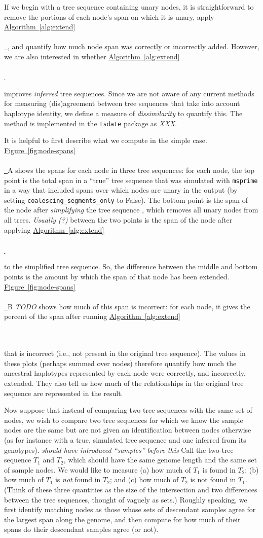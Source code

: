 \documentclass[10pt,twoside,lineno]{gsajnl}
\newcommand{\msprime}{\texttt{msprime}}
\newcommand{\comment}[1]{{\color{violet} \it #1}}
\newcommand{\algorithmref}[2][]{%
	\hyperref[{#2}]{%
		Algorithm~\ref*{#2}%
		\ifx\\#1\\%
		\else
		\,#1%
		\fi
	}%
}
\newcommand*{\figref}[2][]{%
	\hyperref[{#2}]{%
		Figure~\ref*{#2}%
		\ifx\\#1\\%
		\else
		\,#1%
		\fi
	}%
}
\begin{document}
If we begin with a tree sequence containing unary nodes,
it is straightforward to remove the portions of each node's span on which it is unary,
apply \algorithmref{alg:extend},
and quantify how much node span was correctly or incorrectly added.
However, we are also interested in whether \algorithmref{alg:extend}
improves \emph{inferred} tree sequences.
Since we are not aware of any current methods for measuring (dis)agreement between tree sequences
that take into account haplotype identity,
we define a measure of \emph{dissimilarity} to quantify this.
The method is implemented in the \texttt{tsdate} package \citep{wohns2022unified}
as \comment{XXX}.

It is helpful to first describe what we compute in the simple case.
\figref{fig:node-spans}A shows the spans for each node in three tree sequences:
for each node, the top point is the total span in a ``true'' tree sequence
that was simulated with \msprime \citep{kelleher2016efficient,baumdicker2021efficient}
in a way that included spans over which nodes are unary in the output
(by setting \texttt{coalescing\_segments\_only} to False).
The bottom point is the span of the node after \emph{simplifying} the tree sequence
\citep{kelleher2018efficient},
which removes all unary nodes from all trees.
\comment{Usually (?)} between the two points
is the span of the node after applying \algorithmref{alg:extend}
to the simplified tree sequence.
So, the difference between the middle and bottom points is the amount by which
the span of that node has been extended.
\figref{fig:node-spans}B \comment{TODO} shows how much of this span is incorrect:
for each node, it gives the percent of the span after running \algorithmref{alg:extend}
that is incorrect (i.e., not present in the original tree sequence).
The values in these plots (perhaps summed over nodes)
therefore quantify how much the ancestral haplotypes represented by each node
were correctly, and incorrectly, extended.
They also tell us how much of the relationships in the original tree sequence
are represented in the result.

Now suppose that instead of comparing two tree sequences with the same set of nodes,
we wish to compare two tree sequences for which we know the sample nodes are the same
but are not given an identification between nodes otherwise
(as for instance with a true, simulated tree sequence and one inferred from its genotypes).
\comment{should have introduced ``samples'' before this}
Call the two tree sequence $T_1$ and $T_2$, which should have the same genome length
and the same set of sample nodes.
We would like to measure (a) how much of $T_1$ is found in $T_2$;
(b) how much of $T_1$ is \emph{not} found in $T_2$; and
(c) how much of $T_2$ is not found in $T_1$.
(Think of these three quantities as the size of the intersection
and two differences between the tree sequences,
thought of vaguely as sets.)
Roughly speaking, we first identify matching nodes
as those whose sets of descendant samples agree for the largest span along the genome,
and then compute for how much of their spans do their descendant samples agree (or not).
\end{document}
